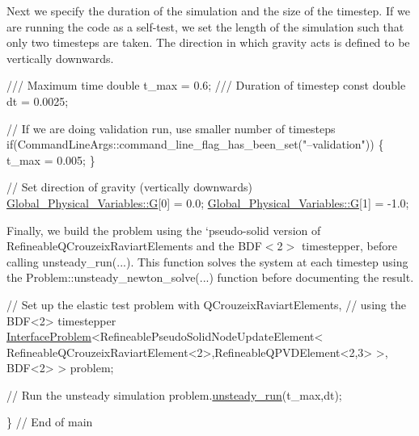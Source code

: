 \begin{DoxyCodeInclude}
\end{DoxyCodeInclude}


Next we specify the duration of the simulation and the size of the timestep. If we are running the code as a self-\/test, we set the length of the simulation such that only two timesteps are taken. The direction in which gravity acts is defined to be vertically downwards.


\begin{DoxyCodeInclude}
 \textcolor{comment}{/// Maximum time}
 \textcolor{keywordtype}{double} t\_max = 0.6;
\textcolor{comment}{}
\textcolor{comment}{ /// Duration of timestep}
\textcolor{comment}{} \textcolor{keyword}{const} \textcolor{keywordtype}{double} dt = 0.0025;

 \textcolor{comment}{// If we are doing validation run, use smaller number of timesteps}
 \textcolor{keywordflow}{if}(CommandLineArgs::command\_line\_flag\_has\_been\_set(\textcolor{stringliteral}{"--validation"}))
  \{
   t\_max = 0.005;
  \}

 \textcolor{comment}{// Set direction of gravity (vertically downwards)}
 \hyperlink{namespaceGlobal__Physical__Variables_a37a6f46efcb35b4bd12c73f19d741020}{Global\_Physical\_Variables::G}[0] = 0.0;
 \hyperlink{namespaceGlobal__Physical__Variables_a37a6f46efcb35b4bd12c73f19d741020}{Global\_Physical\_Variables::G}[1] = -1.0;

\end{DoxyCodeInclude}


Finally, we build the problem using the `pseudo-\/solid\textquotesingle{} version of {\ttfamily Refineable\+Q\+Crouzeix\+Raviart\+Elements} and the {\ttfamily B\+D\+F$<$2$>$} timestepper, before calling {\ttfamily unsteady\+\_\+run}(...). This function solves the system at each timestep using the {\ttfamily Problem\+::unsteady\+\_\+newton\+\_\+solve}(...) function before documenting the result.


\begin{DoxyCodeInclude}
 \textcolor{comment}{// Set up the elastic test problem with QCrouzeixRaviartElements,}
 \textcolor{comment}{// using the BDF<2> timestepper}
 \hyperlink{classInterfaceProblem}{InterfaceProblem}<RefineablePseudoSolidNodeUpdateElement<
 RefineableQCrouzeixRaviartElement<2>,RefineableQPVDElement<2,3> >, BDF<2> >
  problem;
 
 \textcolor{comment}{// Run the unsteady simulation}
 problem.\hyperlink{classInterfaceProblem_adf1f4e43d10939e4323e0e315b711085}{unsteady\_run}(t\_max,dt);
 
\} \textcolor{comment}{// End of main}

\end{DoxyCodeInclude}




